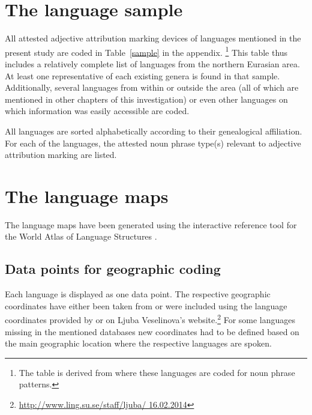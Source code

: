 \section{The language sample}
All attested adjective attribution marking devices of languages mentioned in the present study are coded in Table~\ref{sample} in the appendix.
\footnote{The table is derived from \citet{AUTOTYP-NP} where these languages are coded for noun phrase patterns.}
 This table thus includes a relatively complete list of languages from the northern Eurasian area. At least one representative of each existing genera is found in that sample. Additionally, several languages from within or outside the area (all of which are mentioned in other chapters of this investigation) or even other languages on which information was easily accessible are coded.

All languages are sorted alphabetically according to their genealogical affiliation. For each of the languages, the attested noun phrase type(s) relevant to adjective attribution marking are listed.

\section{The language maps}
The language maps have been generated using the interactive reference tool 
for the World Atlas of Language Structures \citep{bibiko2005}. 

\subsection[Geographic coding]{Data points for geographic coding}
Each language is displayed as one data point. The respective geographic coordinates have either been taken from \cite{WALS} or were included using the language coordinates provided by \cite{AUTOTYP} or on Ljuba Veselinova's website.\footnote{\url{http://www.ling.su.se/staff/ljuba/ 16.02.2014}} For some languages missing in the mentioned databases new coordinates had to be defined based on the main geographic location where the respective languages are spoken.

